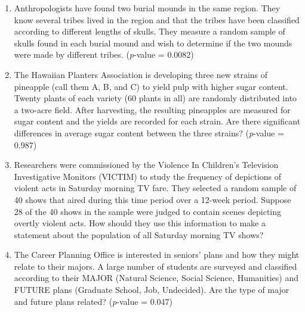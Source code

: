 \renewcommand{\labelenumi}{\Alph{enumi}.}





\begin{enumerate}[leftmargin=1cm, itemsep=.2em]


\item Anthropologists have found two burial mounds in the same region. They know several tribes lived in the region and that the tribes have been classified according to different lengths of skulls. They measure a random sample of skulls found in each burial mound and wish to determine if the two mounds were made by different tribes. (\textit{p}-value = 0.0082) 





\bigskip





\item The Hawaiian Planters Association is developing three new strains of pineapple (call them A, B, and C) to yield pulp with higher sugar content. Twenty plants of each variety (60 plants in all) are randomly distributed into a two-acre field. After harvesting, the resulting pineapples are measured for sugar content and the yields are recorded for each strain. Are there significant differences in average sugar content between the three strains? (\textit{p}-value = 0.987)


\bigskip 


\item Researchers were commissioned by the Violence In Children's Television Investigative Monitors (VICTIM) to study the frequency of depictions of violent acts in Saturday morning TV fare. They selected a random sample of 40 shows that aired during this time period over a 12-week period. Suppose 28 of the 40 shows in the sample were judged to contain scenes depicting overtly violent acts. How should they use this information to make a statement about the population of all Saturday morning TV shows?


\bigskip 


\item The Career Planning Office is interested in seniors' plans and how they might relate to their majors. A large number of students are surveyed and classified according to their MAJOR (Natural Science, Social Science, Humanities) and FUTURE plans (Graduate School, Job, Undecided). Are the type of major and future plans related? (\textit{p}-value = 0.047)



\end{enumerate}
